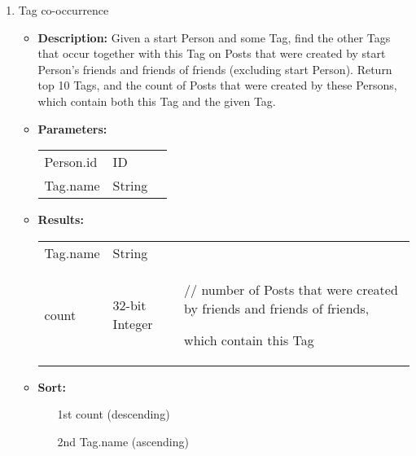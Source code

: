 {\begin{enumerate}
        \item Tag co-occurrence
            \begin{itemize}
                \item \textbf{Description:}
                    Given a start Person and some Tag, find the other Tags that occur
                    together with this Tag on Posts that were created by start Person's
                    friends and friends of friends (excluding start Person).  Return
                    top 10 Tags, and the count of Posts that were created by these
                    Persons, which contain both this Tag and the given Tag. 
                \item \textbf{Parameters:} \\
                    \begin{tabular}{lll}
                        Person.id 										& ID & \\
                        Tag.name 	 									& String & \parbox[t]{20cm}{\par \strut} \\
                    \end{tabular}		
                \item \textbf{Results:} \\
                    \begin{tabular}{lll}
                        Tag.name 	 						& String & \parbox[t]{20cm}{\par \strut} \\
                        count 								& 32-bit Integer & \parbox[t]{20cm}{// number of Posts that were created by friends and friends of friends, \par 
                    which contain this Tag\strut} \\
                \end{tabular}		
                \item \textbf{Sort:}
                  \begin{itemize}
                    \item[1st] count (descending)
                    \item[2nd] Tag.name (ascending)
                  \end{itemize}
        \end{itemize}


\end{enumerate}}
